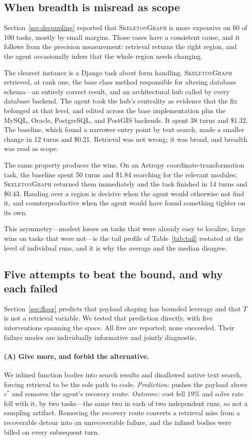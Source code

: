 \documentclass[11pt,letterpaper]{article}
\newcommand{\sg}{\textsc{SkeletonGraph}}
\begin{document}
\subsection{When breadth is misread as scope}
\label{sec:scope}
Section~\ref{sec:decoupling} reported that \sg{} is more expensive on 60 of 100
tasks, mostly by small margins. Those cases have a consistent cause, and it
follows from the precision measurement: retrieval returns the right region, and
the agent occasionally infers that the whole region needs changing.

The clearest instance is a Django task about form handling. \sg{} retrieved, at
rank one, the base class method responsible for altering database schema---an
entirely correct result, and an architectural hub called by every database
backend. The agent took the hub's centrality as evidence that the fix belonged at
that level, and edited across the base implementation plus the MySQL, Oracle,
PostgreSQL, and PostGIS backends. It spent 38 turns and \$1.32. The baseline,
which found a narrower entry point by text search, made a smaller change in 12
turns and \$0.21. Retrieval was not wrong; it was broad, and breadth was read as
scope.

The same property produces the wins. On an Astropy coordinate-transformation
task, the baseline spent 50 turns and \$1.84 searching for the relevant modules;
\sg{} returned them immediately and the task finished in 14 turns and \$0.43.
Handing over a region is decisive when the agent would otherwise not find it, and
counterproductive when the agent would have found something tighter on its own.

This asymmetry---modest losses on tasks that were already easy to localize, large
wins on tasks that were not---is the tail profile of Table~\ref{tab:tail} restated
at the level of individual runs, and it is why the average and the median
disagree.

\subsection{Five attempts to beat the bound, and why each failed}
\label{sec:interventions}
Section~\ref{sec:floor} predicts that payload shaping has bounded leverage and
that $T$ is not a retrieval variable. We tested that prediction directly, with
five interventions spanning the space. All five are reported; none succeeded.
Their failure modes are individually informative and jointly diagnostic.

\paragraph{(A) Give more, and forbid the alternative.}
We inlined function bodies into search results and disallowed native text search,
forcing retrieval to be the sole path to code. \emph{Prediction:} pushes the
payload above $c^{*}$ and removes the agent's recovery route. \emph{Outcome:} cost
fell 19\% and solve rate fell with it, by two tasks---the same two in each of two
independent runs, so not a sampling artifact. Removing the recovery route converts
a retrieval miss from a recoverable detour into an unrecoverable failure, and the
inlined bodies were billed on every subsequent turn.
\end{document}
